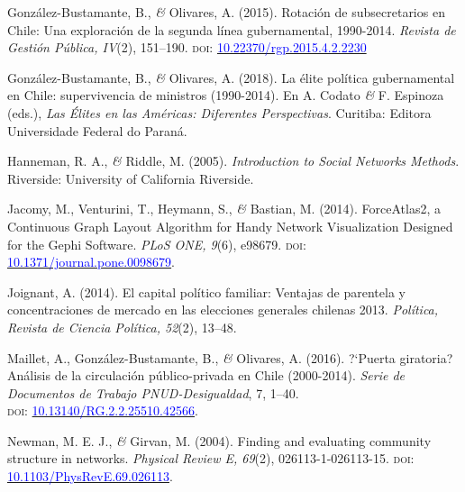 \documentclass[a4paper]{tufte-handout}
\begin{document}
{\begin{list}{}
\item{\small González-Bustamante, B., {\itshape \&} Olivares, A. (2015). Rotación de subsecretarios en Chile: Una exploración de la segunda línea gubernamental, 1990-2014. {\itshape Revista de Gestión Pública, IV}(2), 151--190. {\scshape doi:} \href{https://doi.org/10.22370/rgp.2015.4.2.2230}{\textcolor{blue}{10.22370/rgp.2015.4.2.2230}}}

\item{\small Gonz\'alez-Bustamante, B., {\itshape \&} Olivares, A. (2018). La \'elite pol\'itica gubernamental en Chile: supervivencia de ministros (1990-2014). En A. Codato {\itshape \&} F. Espinoza (eds.),{ \itshape Las \'Elites en las Am\'ericas: Diferentes Perspectivas}. Curitiba: Editora Universidade Federal do Paran\'a.}

\item{\small Hanneman, R. A., {\itshape \&} Riddle, M. (2005). {\itshape Introduction to Social Networks Methods}. Riverside: University of California Riverside.}

\item{\small Jacomy, M., Venturini, T., Heymann, S., {\itshape \&} Bastian, M. (2014). ForceAtlas2, a Continuous Graph Layout Algorithm for Handy Network Visualization Designed for the Gephi Software. {\itshape PLoS ONE, 9}(6), e98679. {\scshape doi:} \href{https://doi.org/10.1371/journal.pone.0098679}{\textcolor{blue}{10.1371/journal.pone.0098679}}.}

\item{\small Joignant, A. (2014). El capital pol\'itico familiar: Ventajas de parentela y concentraciones de mercado en las elecciones generales chilenas 2013. {\itshape Pol\'itica, Revista de Ciencia Pol\'itica, 52}(2), 13--48.}

\item{\small Maillet, A., Gonz\'alez-Bustamante, B., {\itshape \&} Olivares, A. (2016). ?`Puerta giratoria? An\'alisis de la circulaci\'on p\'ublico-privada en Chile (2000-2014). {\itshape Serie de Documentos de Trabajo PNUD-Desigualdad}, 7,  1--40. \\ {\scshape doi:} \href{https://doi.org/10.13140/RG.2.2.25510.42566}{\textcolor{blue}{10.13140/RG.2.2.25510.42566}}.}

\item {\small Newman, M. E. J., {\itshape \&} Girvan, M. (2004). Finding and evaluating community structure in networks. {\itshape Physical Review E, 69}(2), 026113-1-026113-15. {\scshape doi:} \href{https://doi.org/10.1103/PhysRevE.69.026113}{\textcolor{blue}{10.1103/PhysRevE.69.026113}}.}


\end{list}}
\end{document}
